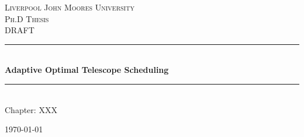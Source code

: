 \documentclass[12pt,a4paper]{article}
\newcommand{\HRule}{\rule{\linewidth}{0.5mm}}
\numberwithin{figure}{section}
\numberwithin{table}{section}
\numberwithin{algorithm}{section}
\begin{document}
\setlength{\parindent}{5mm}
\setlength{\parskip}{10pt plus2mm minus2mm}
\thispagestyle{empty}

\begin{titlepage}
 
\begin{center}
 
\textsc{\LARGE Liverpool John Moores University}\\[1.5cm]
 
\textsc{\Large Ph.D Thesis}\\[0.5cm]
\textsc{\large DRAFT}\\[0.5cm]
 
\HRule \\[0.4cm]
{ \Large \bfseries Adaptive Optimal Telescope Scheduling}\\[0.4cm]
 
\HRule \\[1.5cm]
 
{ \large Chapter: XXX}
 
\vfill
 
{\large \today}
 
\end{center}
 
\end{titlepage}


\end{document}
